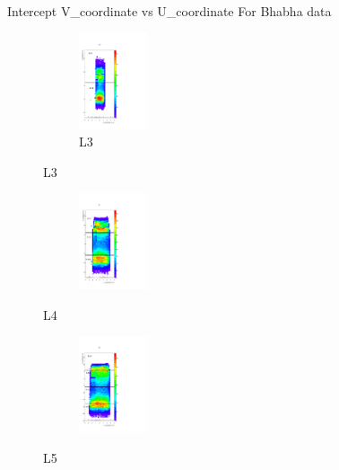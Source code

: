 \documentclass[xcolor=dvipsnames]{beamer}
\begin{document}
 \begin{frame}{Intercept V\_coordinate vs U\_coordinate}
 	For Bhabha data
 	\begin{multicols}{4}	
 		\begin{figure}[H]
 			\begin{center}				
 				\begin{subfigure}[b]{0.30\textwidth}
 					\includegraphics[width=2cm]{L3_bhabha.pdf}
 					\caption*{L3}
 				\end{subfigure}				
 			\end{center}
 		\end{figure}
 		\begin{figure}[H]
 			\begin{center}				
 				\begin{subfigure}[b]{0.30\textwidth}
 					\includegraphics[width=2cm]{L4_bhabha.pdf}
 				\end{subfigure}		
 				\caption*{L4}		
 			\end{center}
 		\end{figure}
 		\begin{figure}[H]
 			\begin{center}				
 				\begin{subfigure}[b]{0.30\textwidth}
 					\includegraphics[width=2cm]{L5_bhabha.pdf}
 				\end{subfigure}		
 				\caption*{L5}		
 			\end{center}
 		\end{figure}
 		\begin{figure}[H]

\end{figure}
\end{multicols}
\end{frame}
\end{document}
